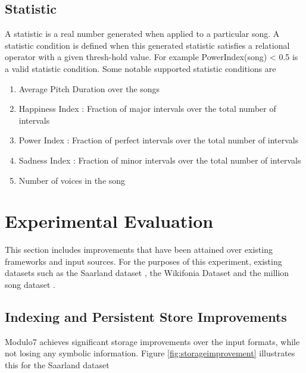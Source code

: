 \documentclass{article}
\begin{document}
\subsection{Statistic}

A statistic is a real number generated when applied to a particular song. A statistic condition is defined when this generated statistic satisfies a relational operator with a given thresh-hold value. For example PowerIndex(song) < 0.5 is a valid statistic condition. Some notable supported statistic conditions are 

\begin{enumerate}
\item Average Pitch Duration over the songs
\item Happiness Index : Fraction of major intervals over the total number of intervals
\item Power Index : Fraction of perfect intervals over the total number of intervals
\item Sadness Index : Fraction of minor intervals over the total number of intervals
\item Number of voices in the song
\end{enumerate}

\section{Experimental Evaluation}

This section includes improvements that have been attained over existing frameworks and input sources. For the purposes of this experiment, existing datasets such as the Saarland dataset \cite{saarlandmsd}, the Wikifonia Dataset \cite{WikifoniaDataset} and the million song dataset \cite{msd}. 

\subsection{Indexing and Persistent Store Improvements}

Modulo7 achieves significant storage improvements over the input formats, while not losing any symbolic information. Figure \ref{fig:storageimprovement} illustrates this for the Saarland dataset \cite{saarlandmsd} \\
\end{document}

